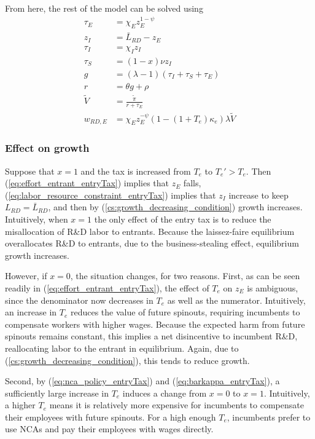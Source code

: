 \documentclass[11pt,english]{article}
\theoremstyle{remark}
\begin{document}
From here, the rest of the model can be solved using
\begin{align}
\tau_E &= \chi_E z_E^{1-\psi} \\
z_I &= \bar{L}_{RD} - z_E \label{eq:labor_resource_constraint_entryTax}\\ 
\tau_I &= \chi_I z_I \\
\tau_S &= (1-x) \nu z_I \\
g &= (\lambda - 1) (\tau_I + \tau_S + \tau_E) \\
r &= \theta g + \rho \\
\tilde{V} &= \frac{\tilde{\pi}}{r + \tau_E} \\ 
w_{RD,E} &= \chi_E z_E^{-\psi} (1-(1+T_e)\kappa_e) \lambda \tilde{V} \label{eq:wage_rd_labor_entryTax}
\end{align}

\subsubsection{Effect on growth}

Suppose that $x = 1$ and the tax is increased from $T_e$ to $T_e' > T_e$. Then (\ref{eq:effort_entrant_entryTax}) implies that $z_E$ falls, (\ref{eq:labor_resource_constraint_entryTax}) implies that $z_I$ increase to keep $L_{RD} = \bar{L}_{RD}$, and then by (\ref{cs:growth_decreasing_condition}) growth increases. Intuitively, when $x = 1$ the only effect of the entry tax is to reduce the misallocation of R\&D labor to entrants. Because the laissez-faire equilibrium overallocates R\&D to entrants, due to the business-stealing effect, equilibrium growth increases.

However, if $x = 0$, the situation changes, for two reasons. First, as can be seen readily in (\ref{eq:effort_entrant_entryTax}), the effect of $T_e$ on $z_E$ is ambiguous, since the denominator now decreases in $T_e$ as well as the numerator. Intuitively, an increase in $T_e$ reduces the value of future spinouts, requiring incumbents to compensate workers with higher wages. Because the expected harm from future spinouts remains constant, this implies a net disincentive to incumbent R\&D, reallocating labor to the entrant in equilibrium. Again, due to (\ref{cs:growth_decreasing_condition}), this tends to reduce growth.

Second, by (\ref{eq:nca_policy_entryTax}) and (\ref{eq:barkappa_entryTax}), a sufficiently large increase in $T_e$ induces a change from $x = 0$ to $x = 1$. Intuitively, a higher $T_e$ means it is relatively more expensive for incumbents to compensate their employees with future spinouts. For a high enough $T_e$, incumbents prefer to use NCAs and pay their employees with wages directly.
\end{document}
